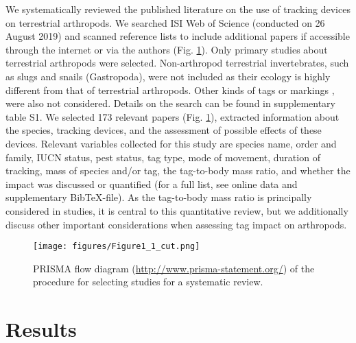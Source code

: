 \documentclass[10pt, twoside]{book} %
\begin{document}
We systematically reviewed the published literature on the use of tracking devices on terrestrial arthropods. We searched ISI Web of Science (conducted on 26 August 2019) and scanned reference lists to include additional papers if accessible through the internet or via the authors (Fig. \ref{fig1.1}). Only primary studies about terrestrial arthropods were selected. Non-arthropod terrestrial invertebrates, such as slugs and snails (Gastropoda), were not included as their ecology is highly different from that of terrestrial arthropods. Other kinds of tags or markings \citep[e.g. numbered labels, coloured markings, or biotelemetry; the latter being tags to measure physiological and energetic variables remotely;][]{cooke2004}, were also not considered. Details on the search can be found in supplementary table S1. We selected 173 relevant papers (Fig. \ref{fig1.1}), extracted information about the species, tracking devices, and the assessment of possible effects of these devices. Relevant variables collected for this study are species name, order and family, IUCN status, pest status, tag type, mode of movement, duration of tracking, mass of species and/or tag, the tag-to-body mass ratio, and whether the impact was discussed or quantified (for a full list, see online data and supplementary BibTeX-file). As the tag-to-body mass ratio is principally considered in studies, it is central to this quantitative review, but we additionally discuss other important considerations when assessing tag impact on arthropods.\\

\begin{figure}[hb!]
	\begin{center}
		\texttt{[image: figures/Figure1\_1\_cut.png]}
	\end{center}
	\begin{footnotesize}
		\caption{PRISMA flow diagram (\url{http://www.prisma-statement.org/}) of the procedure for selecting studies for a systematic review. \label{fig1.1}}
	\end{footnotesize}
\end{figure}

\clearpage
		
	\section{Results}
\end{document}
